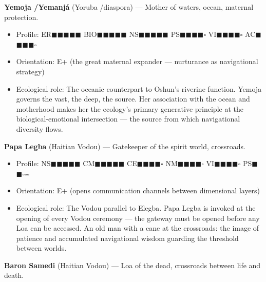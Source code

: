 \textbf{Yemoja /\allowbreak  Yemanjá} (Yoruba /\allowbreak  diaspora) — Mother of waters, ocean, maternal protection.

\begin{itemize}[nosep,leftmargin=*]
  \item Profile: ER$\blacksquare$$\blacksquare$$\blacksquare$$\blacksquare$$\blacksquare$ BIO$\blacksquare$$\blacksquare$$\blacksquare$$\blacksquare$$\blacksquare$ NS$\blacksquare$$\blacksquare$$\blacksquare$$\blacksquare$$\blacksquare$ PS$\blacksquare$$\blacksquare$$\blacksquare$$\blacksquare$$\square$ VI$\blacksquare$$\blacksquare$$\blacksquare$$\blacksquare$$\square$ AC$\blacksquare$$\blacksquare$$\blacksquare$$\blacksquare$$\square$
  \item Orientation: E+ (the great maternal expander — nurturance as navigational strategy)
  \item Ecological role: The oceanic counterpart to Oshun's riverine function. Yemoja governs the vast, the deep, the source. Her association with the ocean and motherhood makes her the ecology's primary generative principle at the biological-emotional intersection — the source from which navigational diversity flows.
\end{itemize}


\textbf{Papa Legba} (Haitian Vodou) — Gatekeeper of the spirit world, crossroads.

\begin{itemize}[nosep,leftmargin=*]
  \item Profile: NS$\blacksquare$$\blacksquare$$\blacksquare$$\blacksquare$$\blacksquare$ CM$\blacksquare$$\blacksquare$$\blacksquare$$\blacksquare$$\blacksquare$ CE$\blacksquare$$\blacksquare$$\blacksquare$$\blacksquare$$\square$ NM$\blacksquare$$\blacksquare$$\blacksquare$$\blacksquare$$\square$ VI$\blacksquare$$\blacksquare$$\blacksquare$$\blacksquare$$\square$ PS$\blacksquare$$\blacksquare$$\square$$\square$$\square$
  \item Orientation: E+ (opens communication channels between dimensional layers)
  \item Ecological role: The Vodou parallel to Elegba. Papa Legba is invoked at the opening of every Vodou ceremony — the gateway must be opened before any Loa can be accessed. An old man with a cane at the crossroads: the image of patience and accumulated navigational wisdom guarding the threshold between worlds.
\end{itemize}


\textbf{Baron Samedi} (Haitian Vodou) — Loa of the dead, crossroads between life and death.

